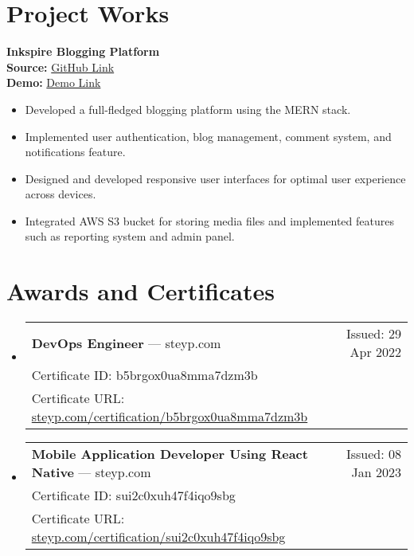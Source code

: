 \documentclass[a4paper,10pt]{article}
\begin{document}
\section*{Project Works}
\noindent
\textbf{Inkspire Blogging Platform} \\
\textbf{Source:} \href{https://github.com/your-username/inkspire}{GitHub Link} \\
\textbf{Demo:} \href{https://inkspire-demo-link.com}{Demo Link}
\begin{itemize}[leftmargin=0.15in]
    \item Developed a full-fledged blogging platform using the MERN stack.
    \item Implemented user authentication, blog management, comment system, and notifications feature.
    \item Designed and developed responsive user interfaces for optimal user experience across devices.
    \item Integrated AWS S3 bucket for storing media files and implemented features such as reporting system and admin panel.
\end{itemize}

\section*{Awards and Certificates}
\begin{itemize}[leftmargin=0.15in]
    \item \begin{tabularx}{\textwidth}{Xr}
        \textbf{DevOps Engineer} — steyp.com & Issued: 29 Apr 2022 \\
        Certificate ID: b5brgox0ua8mma7dzm3b \\
        Certificate URL: \href{https://steyp.com/certification/b5brgox0ua8mma7dzm3b}{steyp.com/certification/b5brgox0ua8mma7dzm3b}
    \end{tabularx}
    \item \begin{tabularx}{\textwidth}{Xr}
        \textbf{Mobile Application Developer Using React Native} — steyp.com & Issued: 08 Jan 2023 \\
        Certificate ID: sui2c0xuh47f4iqo9sbg \\
        Certificate URL: \href{https://steyp.com/certification/sui2c0xuh47f4iqo9sbg}{steyp.com/certification/sui2c0xuh47f4iqo9sbg}
    \end{tabularx}
\end{itemize}
\end{document}
